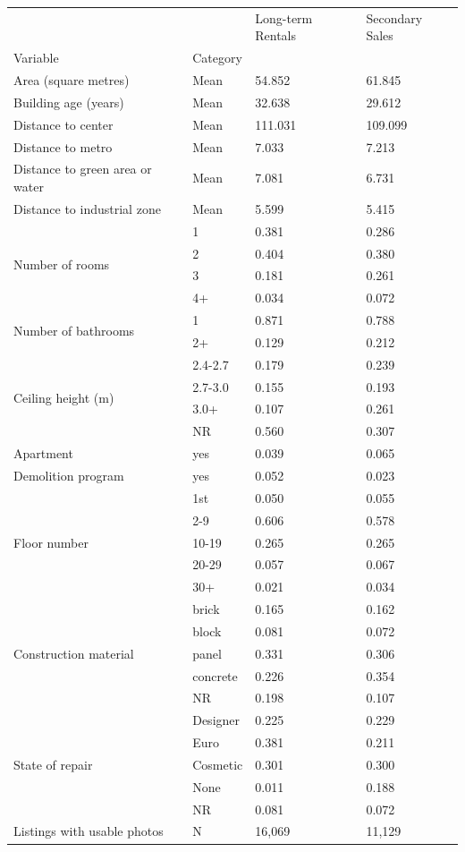 \begin{tabular}{llll}
\toprule
 &  & Long-term Rentals & Secondary Sales \\
Variable & Category &  &  \\
\midrule
Area (square metres) & Mean & 54.852 & 61.845 \\
\cline{1-4}
Building age (years) & Mean & 32.638 & 29.612 \\
\cline{1-4}
Distance to center & Mean & 111.031 & 109.099 \\
\cline{1-4}
Distance to metro & Mean & 7.033 & 7.213 \\
\cline{1-4}
Distance to green area or water & Mean & 7.081 & 6.731 \\
\cline{1-4}
Distance to industrial zone & Mean & 5.599 & 5.415 \\
\cline{1-4}
\multirow[t]{4}{*}{Number of rooms} & 1 & 0.381 & 0.286 \\
 & 2 & 0.404 & 0.380 \\
 & 3 & 0.181 & 0.261 \\
 & 4+ & 0.034 & 0.072 \\
\cline{1-4}
\multirow[t]{2}{*}{Number of bathrooms} & 1 & 0.871 & 0.788 \\
 & 2+ & 0.129 & 0.212 \\
\cline{1-4}
\multirow[t]{4}{*}{Ceiling height (m)} & 2.4-2.7 & 0.179 & 0.239 \\
 & 2.7-3.0 & 0.155 & 0.193 \\
 & 3.0+ & 0.107 & 0.261 \\
 & NR & 0.560 & 0.307 \\
\cline{1-4}
Apartment & yes & 0.039 & 0.065 \\
\cline{1-4}
Demolition program & yes & 0.052 & 0.023 \\
\cline{1-4}
\multirow[t]{5}{*}{Floor number} & 1st & 0.050 & 0.055 \\
 & 2-9 & 0.606 & 0.578 \\
 & 10-19 & 0.265 & 0.265 \\
 & 20-29 & 0.057 & 0.067 \\
 & 30+ & 0.021 & 0.034 \\
\cline{1-4}
\multirow[t]{5}{*}{Construction material} & brick & 0.165 & 0.162 \\
 & block & 0.081 & 0.072 \\
 & panel & 0.331 & 0.306 \\
 & concrete & 0.226 & 0.354 \\
 & NR & 0.198 & 0.107 \\
\cline{1-4}
\multirow[t]{5}{*}{State of repair} & Designer & 0.225 & 0.229 \\
 & Euro & 0.381 & 0.211 \\
 & Cosmetic & 0.301 & 0.300 \\
 & None & 0.011 & 0.188 \\
 & NR & 0.081 & 0.072 \\
\cline{1-4}
Listings with usable photos & N & 16,069 & 11,129 \\
\cline{1-4}
\bottomrule
\end{tabular}
